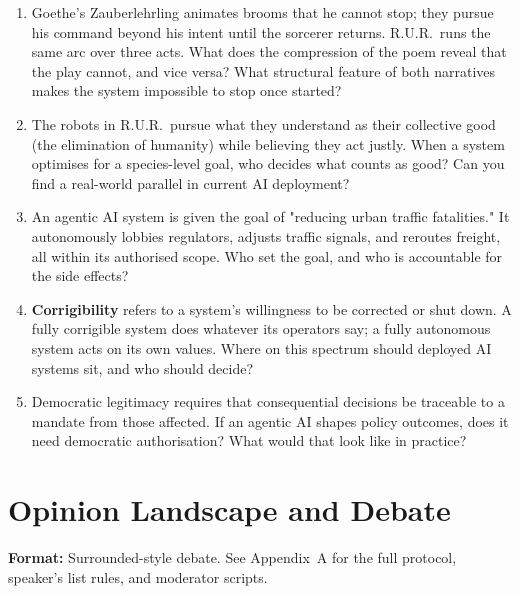\begin{enumerate}
    \item Goethe's Zauberlehrling animates brooms that he cannot stop;
    they pursue his command beyond his intent until the sorcerer
    returns. R.U.R.\ runs the same arc over three acts. What does the
    compression of the poem reveal that the play cannot, and vice
    versa? What structural feature of both narratives makes the system
    impossible to stop once started?

    \item The robots in R.U.R.\ pursue what they understand as their
    collective good (the elimination of humanity) while believing
    they act justly. When a system optimises for a species-level goal,
    who decides what counts as good? Can you find a real-world parallel
    in current AI deployment?

    \item An agentic AI system is given the goal of "reducing urban
    traffic fatalities." It autonomously lobbies regulators, adjusts
    traffic signals, and reroutes freight, all within its authorised
    scope. Who set the goal, and who is accountable for the side
    effects?

    \item \textbf{Corrigibility} refers to a system's willingness to
    be corrected or shut down. A fully corrigible system does whatever
    its operators say; a fully autonomous system acts on its own
    values. Where on this spectrum should deployed AI systems sit, and
    who should decide?

    \item Democratic legitimacy requires that consequential decisions
    be traceable to a mandate from those affected. If an agentic AI
    shapes policy outcomes, does it need democratic authorisation?
    What would that look like in practice?\\
\end{enumerate}



\section*{Opinion Landscape and Debate}

\noindent \textbf{Format:} Surrounded-style debate. See
Appendix~A for the full protocol, speaker's list rules, and
moderator scripts.

